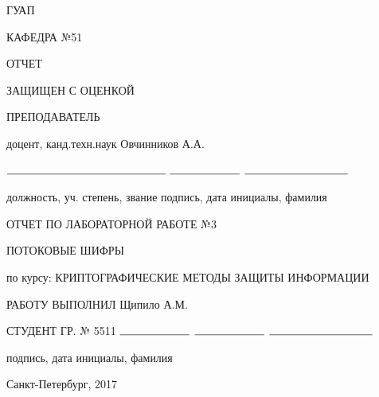 \documentclass{article}
\begin{document}
\begin{titlepage}
	\begin{center}
    	ГУАП
    	\vspace{0.25cm}

    	КАФЕДРА №51
	\end{center}

    \begin{flushleft}

    	ОТЧЕТ

    	ЗАЩИЩЕН С ОЦЕНКОЙ

		ПРЕПОДАВАТЕЛЬ


    	\vspace{0.5cm}
    	
    	доцент, канд.техн.наук \hspace{10.5cm} Овчинников А.А.

		$\rule{5cm}{0.15mm}$ \hfill $\rule{2.2cm}{0.15mm}$  \hfill $\rule{3.25cm}{0.15mm}$

		должность, уч. степень, звание \hfill подпись, дата \hfill инициалы, фамилия
    \end{flushleft}

 	
    \hspace{2cm}

	\begin{center}
    	ОТЧЕТ ПО ЛАБОРАТОРНОЙ РАБОТЕ №3


    	\vspace{1cm}

    	ПОТОКОВЫЕ ШИФРЫ


    	\vspace{1cm}

    	по курсу: КРИПТОГРАФИЧЕСКИЕ МЕТОДЫ ЗАЩИТЫ ИНФОРМАЦИИ
    \end{center}

    \vspace{3cm}

    \begin{flushleft}
    	РАБОТУ ВЫПОЛНИЛ \hspace{10.5cm} Щипило А.М.

    	СТУДЕНТ ГР. № 5511 \hspace{0.5cm} $\rule{2.2cm}{0.15mm}$  \hspace{2cm} $\rule{2.2cm}{0.15mm}$  \hfill $\rule{3.25cm}{0.15mm}$

    	\hspace{8.7cm} подпись, дата \hfill  инициалы, фамилия
    \end{flushleft}

	\vspace{5cm}
	\begin{center}
 		Санкт-Петербург, 2017
	\end{center}
\end{titlepage}
\end{document}
